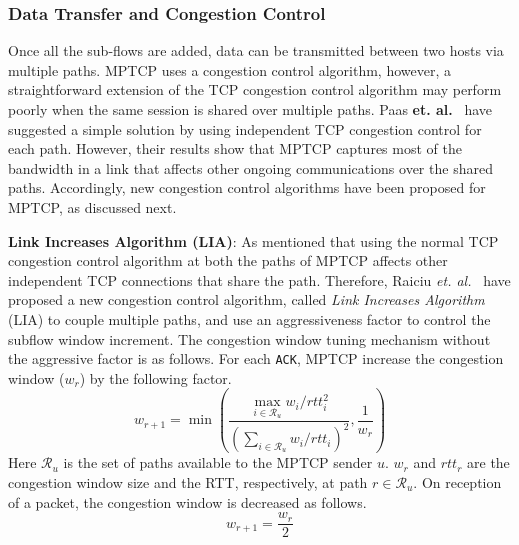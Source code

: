 %
%

\subsubsection{Data Transfer and Congestion Control}
Once all the sub-flows are added, data can be transmitted between two hosts via multiple paths. MPTCP uses a congestion control algorithm, however, a straightforward extension of the TCP congestion control algorithm may perform poorly when the same session is shared over multiple paths. Paas \textbf{et. al.}~\cite{PaaschMptcp} have suggested a simple solution by using independent TCP congestion control for each path. However, their results show that MPTCP captures most of the bandwidth in a link that affects other ongoing communications over the shared paths. Accordingly, new congestion control algorithms have been proposed for MPTCP, as discussed next. 

\textbf{Link Increases Algorithm (LIA)}: As mentioned that using the normal TCP congestion control algorithm at both the paths of MPTCP affects other independent TCP connections that share the path. Therefore, Raiciu \textit{et. al.}~\cite{LIARFC6356} have proposed a new congestion control algorithm, called {\em Link Increases Algorithm} (LIA) to couple multiple paths, and use an aggressiveness factor to control the subflow window increment. The congestion window tuning mechanism without the aggressive factor is as follows. For each \texttt{ACK}, MPTCP increase the congestion window ($w_r$) by the following factor. 
$$w_{r+1} = \min\left( \frac{\max\limits_{i \in \mathcal{R}_u} w_i/rtt_i^2}{\left(\sum_{i \in \mathcal{R}_u}w_i/rtt_i\right)^2}, \frac{1}{w_r}\right) $$
Here $\mathcal{R}_u$ is the set of paths available to the MPTCP sender $u$. $w_r$ and $rtt_r$ are the congestion window size and the RTT, respectively, at path $r \in \mathcal{R}_u$. On reception of a packet, the congestion window is decreased as follows.
$$w_{r+1} = \frac{w_r}{2}$$


